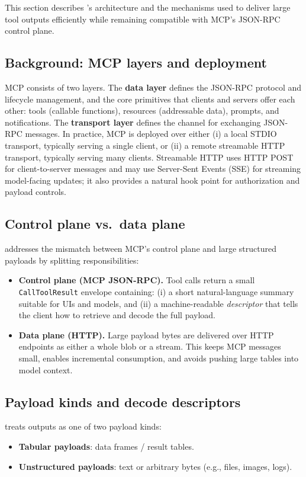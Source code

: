 \label{sec:overview}

This section describes \system’s architecture and the mechanisms used to deliver large tool outputs efficiently while remaining compatible with MCP’s JSON-RPC control plane.

\subsection{Background: MCP layers and deployment}
MCP consists of two layers. The \textbf{data layer} defines the JSON-RPC protocol and lifecycle management, and the core primitives that clients and servers offer each other: tools (callable functions), resources (addressable data), prompts, and notifications. The \textbf{transport layer} defines the channel for exchanging JSON-RPC messages. In practice, MCP is deployed over either (i) a local STDIO transport, typically serving a single client, or (ii) a remote streamable HTTP transport, typically serving many clients. Streamable HTTP uses HTTP POST for client-to-server messages and may use Server-Sent Events (SSE) for streaming model-facing updates; it also provides a natural hook point for authorization and payload controls.

\subsection{Control plane vs.\ data plane}
\system addresses the mismatch between MCP’s control plane and large structured payloads by splitting responsibilities:
\begin{itemize}
    \item \textbf{Control plane (MCP JSON-RPC).} Tool calls return a small \texttt{CallToolResult} envelope containing: (i) a short natural-language summary suitable for UIs and models, and (ii) a machine-readable \emph{descriptor} that tells the client how to retrieve and decode the full payload.
    \item \textbf{Data plane (HTTP).} Large payload bytes are delivered over HTTP endpoints as either a whole blob or a stream. This keeps MCP messages small, enables incremental consumption, and avoids pushing large tables into model context.
\end{itemize}

\subsection{Payload kinds and decode descriptors}
\system treats outputs as one of two payload kinds:
\begin{itemize}
    \item \textbf{Tabular payloads}: data frames / result tables.
    \item \textbf{Unstructured payloads}: text or arbitrary bytes (e.g., files, images, logs).
\end{itemize}

